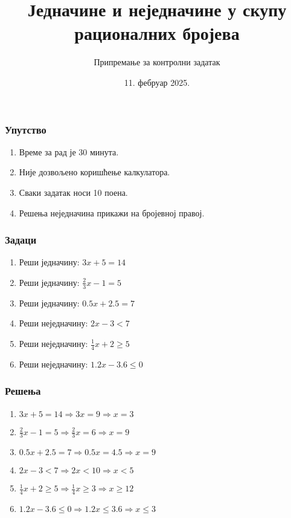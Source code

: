 \documentclass[11pt]{beamer}
\title{Једначине и неједначине у скупу рационалних бројева}
\author{Припремање за контролни задатак}
\institute{ОШ „Иван Горан Ковачић“, Станишић}
\date{11. фебруар 2025.}
\begin{document}
\begin{frame}
    \titlepage
\end{frame}

\begin{frame}
    \frametitle{Упут{}ство}
    \begin{enumerate}
        \item Време за рад је 30 минута.
        \item Није дозвољено коришћење калкулатора.
        \item Сваки задатак носи 10 поена.
        \item Решења неједначина прикажи на бројевној правој.
    \end{enumerate}
\end{frame}

\begin{frame}
    \frametitle{Задаци}

    \begin{enumerate}
        \item Реши једначину: $3x + 5 = 14$
        \item Реши једначину: $\frac{2}{3}x - 1 = 5$
        \item Реши једначину: $0.5x + 2.5 = 7$
        \item Реши неједначину: $2x - 3 < 7$
        \item Реши неједначину: $\frac{1}{4}x + 2 \geqslant 5$
        \item Реши неједначину: $1.2x - 3.6 \leqslant 0$
    \end{enumerate}

\end{frame}

\begin{frame}
    \frametitle{Решења}

    \begin{enumerate}
        \item $3x + 5 = 14 \Rightarrow 3x = 9 \Rightarrow x = 3$
        \item $\frac{2}{3}x - 1 = 5 \Rightarrow \frac{2}{3}x = 6 \Rightarrow x = 9$
        \item $0.5x + 2.5 = 7 \Rightarrow 0.5x = 4.5 \Rightarrow x = 9$
        \item $2x - 3 < 7 \Rightarrow 2x < 10 \Rightarrow x < 5$
        \item $\frac{1}{4}x + 2 \geqslant 5 \Rightarrow \frac{1}{4}x \geqslant 3 \Rightarrow x \geqslant 12$
        \item $1.2x - 3.6 \leqslant 0 \Rightarrow 1.2x \leqslant 3.6 \Rightarrow x \leqslant 3$
    \end{enumerate}

\end{frame}
\end{document}
